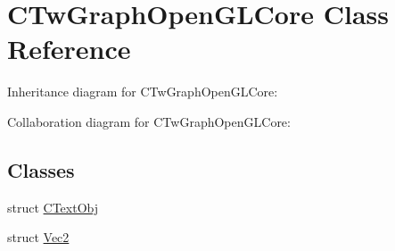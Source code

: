 \hypertarget{class_c_tw_graph_open_g_l_core}{\section{C\+Tw\+Graph\+Open\+G\+L\+Core Class Reference}
\label{class_c_tw_graph_open_g_l_core}
}


Inheritance diagram for C\+Tw\+Graph\+Open\+G\+L\+Core\+:


Collaboration diagram for C\+Tw\+Graph\+Open\+G\+L\+Core\+:
\subsection*{Classes}
\begin{DoxyCompactItemize}
\item 
struct \hyperlink{struct_c_tw_graph_open_g_l_core_1_1_c_text_obj}{C\+Text\+Obj}
\item 
struct \hyperlink{struct_c_tw_graph_open_g_l_core_1_1_vec2}{Vec2}
\end{DoxyCompactItemize}
